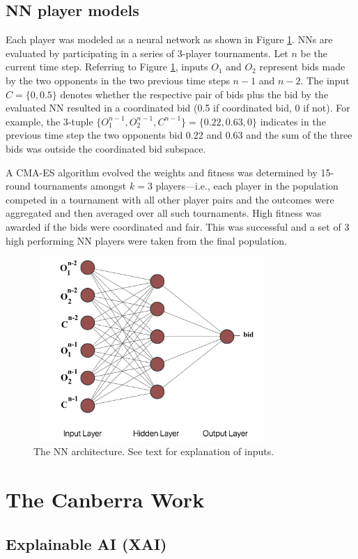 \documentclass{article}   	%
\begin{document}
\subsection{NN player models}
Each player was modeled as a neural network as shown in Figure \ref{fig3}.  NNs are evaluated by participating in a series of 3-player tournaments. Let $n$ be the current time step. Referring to Figure \ref{fig3}, inputs $O_1$ and $O_2$ represent bids made by the two opponents in the two previous time steps $n-1$ and $n-2$. The input $C=\{0, 0.5\}$ denotes
whether the respective pair of bids plus the bid by the evaluated NN resulted in a coordinated bid (0.5 if coordinated bid, 0 if not).  For example, the 3-tuple $\{O_1^{n-1}, O_2^{n-1}, C^{n-1}\}=\{0.22, 0.63, 0\}$ indicates in the previous time step the two opponents bid 0.22 and 0.63 and the sum of the three bids was outside the coordinated bid subspace.

A CMA-ES algorithm evolved the weights and fitness was determined by 15-round tournaments amongst $k=3$ players---i.e., each player in the population competed in a tournament with all other player pairs and the outcomes were aggregated and then averaged over all such tournaments. High fitness was awarded if the bids were coordinated and fair. This was successful and a set of 3 high performing NN players were taken from the final population.
\begin{figure}[htb]
\centerline{\includegraphics[width=9cm,height=7cm]{arch}}
\caption{The NN architecture. See text for explanation of inputs.}
\label{fig3}
\end{figure}

\section{The Canberra Work}

\subsection{Explainable AI (XAI)}
\end{document}
